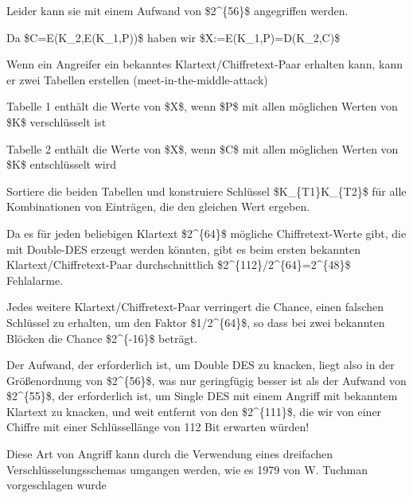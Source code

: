 \documentclass[a4paper]{article}
\begin{document}
\begin{multicols}{3}
\begin{itemize*}
            \begin{itemize*}
                  \item Leider kann sie mit einem Aufwand von \$2\^{}\{56\}\$ angegriffen werden.
                  \item Da \$C=E(K\_2,E(K\_1,P))\$ haben wir \$X:=E(K\_1,P)=D(K\_2,C)\$
                  \item Wenn ein Angreifer ein bekanntes Klartext/Chiffretext-Paar erhalten kann, kann er zwei Tabellen erstellen (meet-in-the-middle-attack)
                  \begin{itemize*} \item Tabelle 1 enthält die Werte von \$X\$, wenn \$P\$ mit allen möglichen Werten von \$K\$ verschlüsselt ist \item Tabelle 2 enthält die Werte von \$X\$, wenn \$C\$ mit allen möglichen Werten von \$K\$ entschlüsselt wird \item Sortiere die beiden Tabellen und konstruiere Schlüssel \$K\_\{T1\}\textbar\textbar K\_\{T2\}\$ für alle Kombinationen von Einträgen, die den gleichen Wert ergeben. \end{itemize*}
            \end{itemize*}
            \item
            Da es für jeden beliebigen Klartext \$2\^{}\{64\}\$ mögliche
            Chiffretext-Werte gibt, die mit Double-DES erzeugt werden könnten,
            gibt es beim ersten bekannten Klartext/Chiffretext-Paar
            durchschnittlich \$2\^{}\{112\}/2\^{}\{64\}=2\^{}\{48\}\$ Fehlalarme.
            \item
            Jedes weitere Klartext/Chiffretext-Paar verringert die Chance, einen
            falschen Schlüssel zu erhalten, um den Faktor \$1/2\^{}\{64\}\$, so
            dass bei zwei bekannten Blöcken die Chance \$2\^{}\{-16\}\$ beträgt.
            \item
            Der Aufwand, der erforderlich ist, um Double DES zu knacken, liegt
            also in der Größenordnung von \$2\^{}\{56\}\$, was nur geringfügig
            besser ist als der Aufwand von \$2\^{}\{55\}\$, der erforderlich ist,
            um Single DES mit einem Angriff mit bekanntem Klartext zu knacken, und
            weit entfernt von den \$2\^{}\{111\}\$, die wir von einer Chiffre mit
            einer Schlüssellänge von 112 Bit erwarten würden!
            \item
            Diese Art von Angriff kann durch die Verwendung eines dreifachen
            Verschlüsselungsschemas umgangen werden, wie es 1979 von W. Tuchman
            vorgeschlagen wurde


\end{itemize*}
\end{multicols}
\end{document}
